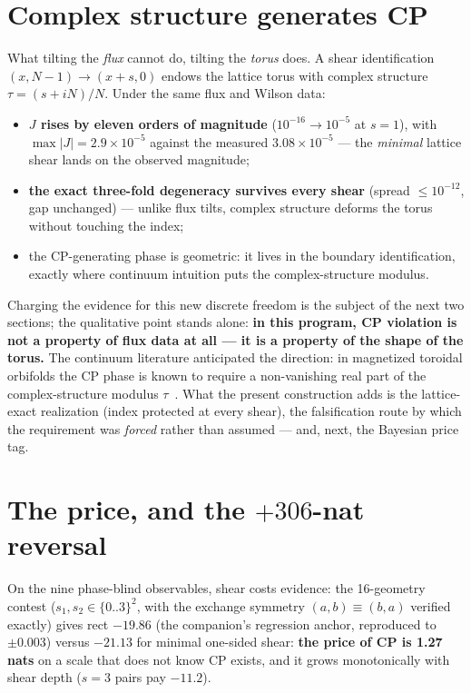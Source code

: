 \documentclass[aps,prd,preprint,nofootinbib]{revtex4-2}
\begin{document}
\section{Complex structure generates CP}

What tilting the \emph{flux} cannot do, tilting the \emph{torus} does. A shear
identification $(x,N-1)\to(x+s,0)$ endows the lattice torus with complex
structure $\tau=(s+iN)/N$. Under the same flux and Wilson data:
\begin{itemize}
\item \textbf{$J$ rises by eleven orders of magnitude} ($10^{-16}\to 10^{-5}$
      at $s=1$), with $\max|J|=2.9\times 10^{-5}$ against the measured
      $3.08\times 10^{-5}$ --- the \emph{minimal} lattice shear lands on the
      observed magnitude;
\item \textbf{the exact three-fold degeneracy survives every shear} (spread
      $\le 10^{-12}$, gap unchanged) --- unlike flux tilts, complex structure
      deforms the torus without touching the index;
\item the CP-generating phase is geometric: it lives in the boundary
      identification, exactly where continuum intuition puts the
      complex-structure modulus.
\end{itemize}

Charging the evidence for this new discrete freedom is the subject of the next
two sections; the qualitative point stands alone: \textbf{in this program, CP
violation is not a property of flux data at all --- it is a property of the
shape of the torus.} The continuum literature anticipated the direction: in
magnetized toroidal orbifolds the CP phase is known to require a non-vanishing
real part of the complex-structure modulus $\tau$~\cite{KNT}. What the present
construction adds is the lattice-exact realization (index protected at every
shear), the falsification route by which the requirement was \emph{forced}
rather than assumed --- and, next, the Bayesian price tag.

\section{The price, and the $+306$-nat reversal}
\label{sec:price}

On the nine phase-blind observables, shear costs evidence: the 16-geometry
contest ($s_1,s_2\in\{0..3\}^2$, with the exchange symmetry $(a,b)\equiv(b,a)$
verified exactly) gives rect $-19.86$ (the companion's regression anchor,
reproduced to $\pm 0.003$) versus $-21.13$ for minimal one-sided shear:
\textbf{the price of CP is 1.27 nats} on a scale that does not know CP exists,
and it grows monotonically with shear depth ($s=3$ pairs pay $-11.2$).
\end{document}
